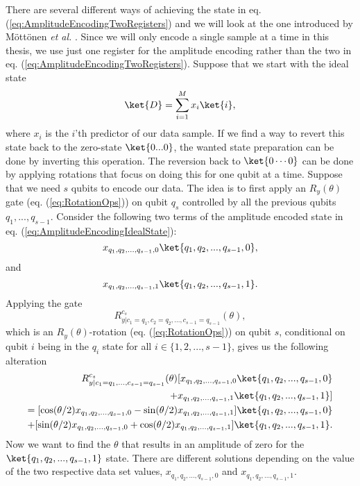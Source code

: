 There are several different ways of achieving the state in eq. (\ref{eq:AmplitudeEncodingTwoRegisters}) and we will look at the one introduced by Möttönen \textit{et al.} \cite{AmplitudeEncoding}.
Since we will only encode a single sample at a time in this thesis, we use just one register for the amplitude encoding rather than the two in eq. (\ref{eq:AmplitudeEncodingTwoRegisters}).
Suppose that we start with the ideal state
\begin{equation}
    \label{eq:AmplitudeEncodingIdealState}
    \ket{D} =  \sum_{i=1}^{M} x_i\ket{i},
\end{equation}
where $x_i$ is the $i$'th predictor of our data sample.
If we find a way to revert this state back to the zero-state $\ket{0...0}$, the wanted state preparation can be done by inverting this operation. The reversion back to $\ket{0\cdots 0}$ can be done by applying rotations that focus on doing this for one qubit at a time.
Suppose that we need $s$ qubits to encode our data. The idea is to first apply an $R_y(\theta)$ gate (eq. (\ref{eq:RotationOps})) on qubit $q_s$ controlled by all the previous qubits $q_1,...,q_{s-1}$. Consider the following two terms of the amplitude encoded state in eq. (\ref{eq:AmplitudeEncodingIdealState}):
$$x_{q_1,q_2,...,q_{s-1},0}\ket{q_1,q_2,...,q_{s-1},0}, $$
and
$$x_{q_1,q_2,...,q_{s-1},1}\ket{q_1,q_2,...,q_{s-1},1}.$$
Applying the gate
$$
R^{c_s}_{y|c_1=q_1,c_2=q_2,...,c_{s-1}=q_{s-1}}(\theta),
$$
which is an $R_y(\theta)$-rotation (eq. (\ref{eq:RotationOps})) on qubit $s$, conditional on qubit $i$ being in the $q_i$ state for all $i \in \{1,2,...,s-1\}$, gives us the following alteration 
\begin{align}
    \label{eq:AmplitudeEncodingRyOnstate}
    R^{c_s}_{y|c_1=q_1,...,c_{s-1}=q_{s-1}}(\theta)[x_{q_1,q_2,...,q_{s-1},0}\ket{q_1,q_2,...,q_{s-1},0} \notag \\
    + x_{q_1,q_2,...,q_{s-1},1}\ket{q_1,q_2,...,q_{s-1},1}] \notag \\
    = [\cos(\theta /2) x_{q_1,q_2,...,q_{s-1},0} - \sin(\theta /2) x_{q_1,q_2,...,q_{s-1},1}] \ket{q_1,q_2,...,q_{s-1},0} \notag \\
    + [\sin(\theta /2) x_{q_1,q_2,...,q_{s-1},0} + \cos(\theta /2) x_{q_1,q_2,...,q_{s-1},1}] \ket{q_1,q_2,...,q_{s-1},1}.
\end{align}
Now we want to find the $\theta$ that results in an amplitude of zero for the $\ket{q_1,q_2,...,q_{s-1},1}$ state. There are different solutions depending on the value of the two respective data set values, $x_{q_1,q_2,...,q_{s-1},0}$ and $x_{q_1,q_2,...,q_{s-1},1}$.

